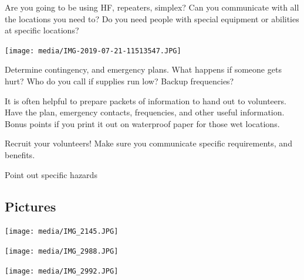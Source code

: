 \documentclass[11pt]{beamer}
\begin{document}
\begin{frame}
	Are you going to be using HF, repeaters, simplex? Can you communicate with all the locations you need to? Do you need people with special equipment or abilities at specific locations?
\end{frame}

\begin{frame}
	\begin{center}
		\texttt{[image: media/IMG-2019-07-21-11513547.JPG]}
	\end{center}
\end{frame}

\begin{frame}
	Determine contingency, and emergency plans. What happens if someone gets hurt? Who do you call if supplies run low? Backup frequencies?
\end{frame}

\begin{frame}
	It is often helpful to prepare packets of information to hand out to volunteers. Have the plan, emergency contacts, frequencies, and other useful information.
	Bonus points if you print it out on waterproof paper for those wet locations.
\end{frame}

\begin{frame}
	Recruit your volunteers!
	Make sure you communicate specific requirements, and benefits.
\end{frame}

\begin{frame}
	Point out specific hazards
\end{frame}

\subsection{Pictures}

\begin{frame}
	\begin{center}
		\texttt{[image: media/IMG\_2145.JPG]}
	\end{center}
\end{frame}

\begin{frame}
	\begin{center}
		\texttt{[image: media/IMG\_2988.JPG]}
	\end{center}
\end{frame}

\begin{frame}
	\begin{center}
		\texttt{[image: media/IMG\_2992.JPG]}
	\end{center}
\end{frame}
\end{document}
